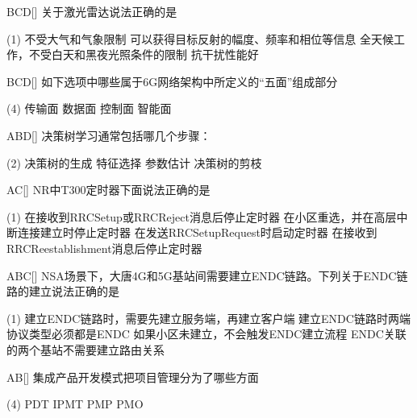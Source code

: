 \begin{choice}{\;BCD\;}[]
    关于激光雷达说法正确的是
    \begin{tasks}(1)
        \task 不受大气和气象限制
        \task 可以获得目标反射的幅度、频率和相位等信息
        \task 全天候工作，不受白天和黑夜光照条件的限制
        \task 抗干扰性能好
    \end{tasks}
\end{choice}

\begin{choice}{\;BCD\;}[]
    如下选项中哪些属于6G网络架构中所定义的“五面”组成部分
    \begin{tasks}(4)
        \task 传输面
        \task 数据面
        \task 控制面
        \task 智能面
    \end{tasks}
\end{choice}


\begin{choice}{\;ABD\;}[]
    决策树学习通常包括哪几个步骤：
    \begin{tasks}(2)
        \task 决策树的生成
        \task   特征选择
        \task 参数估计
        \task 决策树的剪枝
    \end{tasks}
\end{choice}

\begin{choice}{\;AC\;}[]
    NR中T300定时器下面说法正确的是
    \begin{tasks}(1)
        \task 在接收到RRCSetup或RRCReject消息后停止定时器
        \task 在小区重选，并在高层中断连接建立时停止定时器
        \task 在发送RRCSetupRequest时启动定时器
        \task 在接收到RRCReestablishment消息后停止定时器
    \end{tasks}
\end{choice}

\begin{choice}{\;ABC\;}[]
    NSA场景下，大唐4G和5G基站间需要建立ENDC链路。下列关于ENDC链路的建立说法正确的是
    \begin{tasks}(1)
        \task 建立ENDC链路时，需要先建立服务端，再建立客户端
        \task 建立ENDC链路时两端协议类型必须都是ENDC
        \task 如果小区未建立，不会触发ENDC建立流程
        \task ENDC关联的两个基站不需要建立路由关系
    \end{tasks}
\end{choice}


\begin{choice}{\;AB\;}[]
    集成产品开发模式把项目管理分为了哪些方面
    \begin{tasks}(4)
        \task PDT
        \task IPMT
        \task PMP
        \task PMO
    \end{tasks}
\end{choice}



